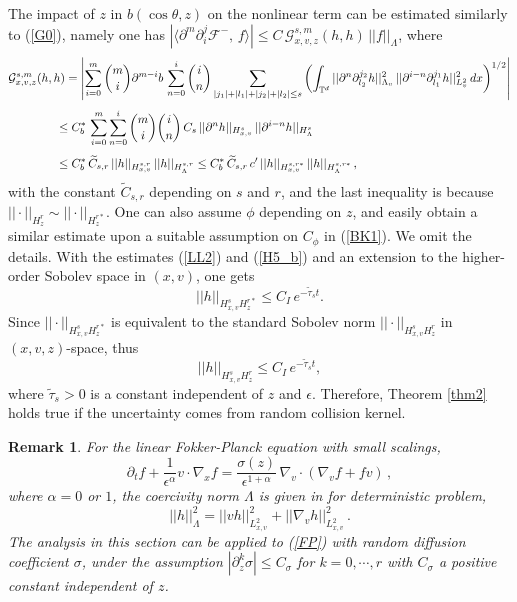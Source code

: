 \documentclass[final,onefignum,onetabnum]{siamart171218}
\newtheorem{remark}[theorem]{Remark}
\begin{document}
The impact of $z$ in $b(\cos\theta,z)$ on the nonlinear term can be estimated similarly to (\ref{G0}), namely one has $|\langle\partial^{m}\partial_i^{j}\mathcal F^{-}, \, f\rangle| \leq C\, \mathcal G^{s,m}_{x,v,z}(h,h)\, ||f||_{\Lambda}$, 
where 
\begin{align}
&\displaystyle \mathcal G^{s,m}_{x,v,z}(h,h) =
\left|\sum_{i=0}^{m}\binom{m}{i} \partial^{m-i}b \, \sum_{n=0}^{i}\binom{i}{n}
\sum_{|j_1|+|l_1|+|j_2|+|l_2|\leq s}\left(\int_{\mathbb T^{d}} ||\partial^{n}\partial_{l_2}^{j_2}h||_{\Lambda_v}^2\, 
||\partial^{i-n}\partial_{l_1}^{j_1}h||_{L^2_v}^2\, dx\right)^{1/2}\right| \notag\\[4pt]
&\displaystyle\qquad\qquad\leq C_b^{\ast}\, \sum_{i=0}^{m}\sum_{n=0}^{i}\binom{m}{i}\binom{i}{n}\, C_s\, ||\partial^n h||_{H_{x,v}^{s}}\, ||\partial^{i-n}h||_{H_{\Lambda}^{s}} \notag\\[4pt]
&\label{H5_b}\displaystyle\qquad\qquad\leq C_b^{\ast}\, \widetilde C_{s,r}\, ||h||_{H_{x,v}^{s,r}}\, ||h||_{H_{\Lambda}^{s,r}}
\leq C_b^{\ast}\, \widetilde C_{s,r}\, c^{\prime}\, ||h||_{H_{x,v}^{s,r\ast}}\, ||h||_{H_{\Lambda}^{s,r\ast}}\,,
\end{align}
with the constant $\widetilde C_{s,r}$ depending on $s$ and $r$, and the last inequality is because $||\cdot||_{H_z^{r}}\sim ||\cdot||_{H_z^{r\ast}}$. 
One can also assume $\phi$ depending on $z$,
and easily obtain a similar estimate upon a suitable assumption on $C_{\phi}$ in (\ref{BK1}). We omit the details.
With the estimates (\ref{LL2}) and (\ref{H5_b}) and an extension to the higher-order Sobolev space in $(x,v)$, one gets
$$||h||_{H_{x,v}^{s} H_z^{r\ast}} \leq  C_{I}\, e^{-\widetilde\tau_s t}. $$ 
Since $||\cdot||_{H_{x,v}^{s} H_z^{r\ast}}$ is equivalent to the standard Sobolev norm $||\cdot||_{H_{x,v}^{s} H_z^{r}}$ in $(x,v,z)$-space, thus
$$||h||_{H_{x,v}^{s} H_z^{r}} \leq  C_{I}\, e^{-\widetilde\tau_s t}, $$ 
where $\widetilde\tau_s>0$ is a constant independent of $z$ and $\epsilon$. 
Therefore, Theorem \ref{thm2} holds true if the uncertainty comes from random collision kernel. 

\begin{remark}
For the linear Fokker-Planck equation with small scalings, 
\begin{equation}\label{FP}\partial_t f +\frac{1}{\epsilon^{\alpha}}v\cdot\nabla_x f = \frac{\sigma(z)}{\epsilon^{1+\alpha}}\, \nabla_v\cdot (\nabla_v f + fv)\,,
\end{equation}
where $\alpha=0$ or $1$, the coercivity norm $\Lambda$ is given in \cite{MB} for deterministic problem, 
$$||h||_{\Lambda}^2 = ||vh||_{L^2_{x,v}}^2 + ||\nabla_v h||_{L^2_{x,v}}^2\,. $$
The analysis in this section can be applied to (\ref{FP}) with random diffusion coefficient $\sigma$, 
under the assumption
$|\partial_z^k \sigma|\leq C_{\sigma}$ for $k=0, \cdots, r$ with $C_{\sigma}$ a positive constant independent of $z$. 
\end{remark}
\end{document}
